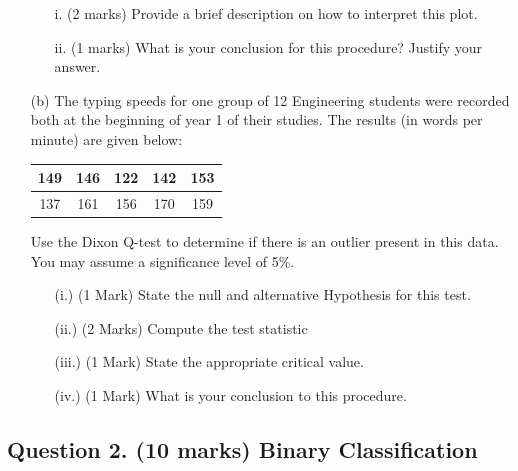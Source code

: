 \documentclass[a4paper,12pt]{article}
\begin{document}
\begin{itemize}
\begin{itemize}
	\item[i.] (2 marks) Provide a brief description on how to interpret this plot.
	\item[ii.] (1 marks) What is your conclusion for this procedure? Justify your answer.
\end{itemize}

\item[(b)] The typing speeds for one group of 12 Engineering students were recorded both at the beginning of year 1 of their studies. The results (in words per minute) are given below:

\begin{center}
	\begin{tabular}{|c|c|c|c|c|}
		\hline
		149  & 146 & 122 & 142 &  153\\ \hline
		137 & 161 & 156&   170&  159
		\\ \hline
	\end{tabular}
\end{center}
Use the Dixon Q-test to determine if there is an outlier present in this data. You may assume a significance level of 5\%.
\begin{itemize}
	\item[(i.)](1 Mark)	State the null and alternative Hypothesis for this test.
	\item[(ii.)](2 Marks) Compute the test statistic
	\item[(iii.)](1 Mark) State the appropriate critical value.
	\item[(iv.)](1 Mark) What is your conclusion to this procedure.
\end{itemize}
\end{itemize} 



\subsection*{Question 2. (10 marks) Binary Classification }
\end{document}
